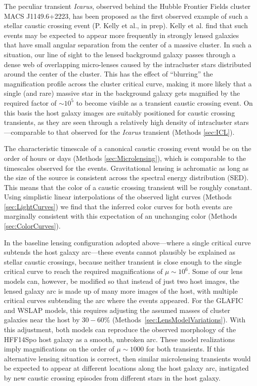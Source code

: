 The peculiar transient {\it Icarus}, observed behind the Hubble
Frontier Fields cluster MACS J1149.6+2223, has been proposed as the
first observed example of such a stellar caustic crossing event
(P. Kelly et al., in prep). Kelly et al. find that such events may be
expected to appear more frequently in strongly lensed galaxies that
have small angular separation from the center of a massive cluster. In
such a situation, our line of sight to the lensed background galaxy
passes through a dense web of overlapping micro-lenses caused by the
intracluster stars distributed around the center of the cluster. This
has the effect of ``blurring'' the magnification profile across the
cluster critical curve, making it more likely that a single (and rare)
massive star in the background galaxy gets magnified by the required
factor of $\sim10^5$ to become visible as a transient caustic crossing
event.  On this basis the \spock host galaxy images are suitably
positioned for caustic crossing transients, as they are seen through a
relatively high density of intracluster stars---comparable to that
observed for the {\it Icarus} transient (Methods \ref{sec:ICL}).

The characteristic timescale of a canonical caustic crossing event
would be on the order of hours or days (Methods
\ref{sec:Microlensing}), which is comparable to the timescales
observed for the \spock events. Gravitational lensing is achromatic as
long as the size of the source is consistent across the spectral
energy distribution (SED).  This means that the color of a caustic
crossing transient will be roughly constant.  Using simplistic linear
interpolations of the observed light curves (Methods
\ref{sec:LightCurves}) we find that the inferred color curves for both
\spock events are marginally consistent with this expectation of an
unchanging color (Methods \ref{sec:ColorCurves}).

In the baseline lensing configuration adopted above---where a single
critical curve subtends the \spock host galaxy arc---these events
cannot plausibly be explained as stellar caustic crossings, because
neither transient is close enough to the single critical curve to
reach the required magnifications of $\mu\sim10^6$.  Some of our lens
models can, however, be modified so that instead of just two host
images, the lensed galaxy arc is made up of many more images of the
host, with multiple critical curves subtending the arc where the
\spock events appeared.  For the GLAFIC and WSLAP models, this
requires adjusting the assumed masses of cluster galaxies near the
\spock host by $30-60\%$ (Methods~\ref{sec:LensModelVariations}).
With this adjustment, both models can reproduce the observed
morphology of the HFF14Spo host galaxy as a smooth, unbroken arc.
These model realizations imply magnifications on the order of
$\mu\sim1000$ for both \spock transients. If this alternative lensing
situation is correct, then similar microlensing transients would be
expected to appear at different locations along the host galaxy arc,
instigated by new caustic crossing episodes from different stars in
the host galaxy.
